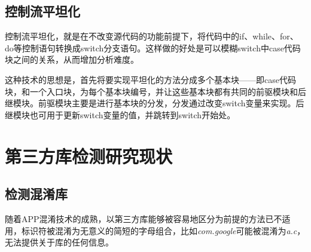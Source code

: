 


\subsection{控制流平坦化}
控制流平坦化，就是在不改变源代码的功能前提下，将代码中的if、while、for、do等控制语句转换成switch分支语句。这样做的好处是可以模糊switch中case代码块之间的关系，从而增加分析难度\cite{balachandran2016control}\cite{laszlo2009obfuscating}。

这种技术的思想是，首先将要实现平坦化的方法分成多个基本块——即case代码块，和一个入口块，为每个基本块编号，并让这些基本块都有共同的前驱模块和后继模块。前驱模块主要是进行基本块的分发，分发通过改变switch变量来实现。后继模块也可用于更新switch变量的值，并跳转到switch开始处\cite{王柯林2021基于随机森林的抗混淆}。





\section{第三方库检测研究现状}

\subsection{检测混淆库}
随着APP混淆技术的成熟，以第三方库能够被容易地区分为前提的方法已不适用，标识符被混淆为无意义的简短的字母组合，比如\textit{com.google}可能被混淆为\textit{a.c}，无法提供关于库的任何信息。



